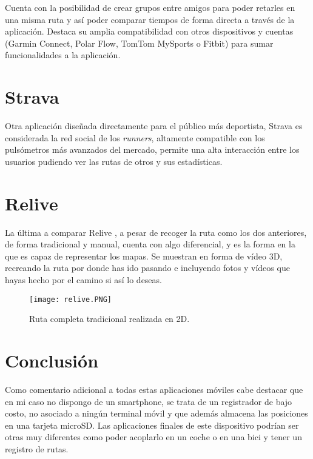 Cuenta con la posibilidad de crear grupos entre amigos para poder retarles en una misma ruta y así poder comparar tiempos de forma directa a través de la aplicación.
Destaca su amplia compatibilidad con otros dispositivos y cuentas (Garmin Connect, Polar Flow, TomTom MySports o Fitbit) para sumar funcionalidades a la aplicación.

\section{Strava}
Otra aplicación diseñada directamente para el público más deportista, Strava \cite{strava} es considerada la red social de los \textit{runners}, altamente compatible con los pulsómetros más avanzados del mercado, permite una alta interacción entre los usuarios pudiendo ver las rutas de otros y sus estadísticas.

\section{Relive}
La última a comparar Relive \cite{relive}, a pesar de recoger la ruta como los dos anteriores, de forma tradicional y manual, cuenta con algo diferencial, y es la forma en la que es capaz de representar los mapas. Se muestran en forma de vídeo 3D, recreando la ruta por donde has ido pasando e incluyendo fotos y vídeos que hayas hecho por el camino si así lo deseas.
\begin{figure}[!h]
	\centering
	\texttt{[image: relive.PNG]}
	\caption{Ruta completa tradicional realizada en 2D.}\label{fig:relive.PNG}
\end{figure}
\FloatBarrier
{}

\section{Conclusión}
Como comentario adicional a todas estas aplicaciones móviles cabe destacar que en mi caso no dispongo de un smartphone, se trata de un registrador de bajo costo, no asociado a ningún terminal móvil y que además almacena las posiciones en una tarjeta microSD. Las aplicaciones finales de este dispositivo podrían ser otras muy diferentes como poder acoplarlo en un coche o en una bici y tener un registro de rutas.


